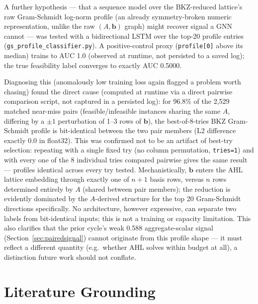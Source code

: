 \documentclass[12pt]{article}
\begin{document}
A further hypothesis --- that a sequence model over the BKZ-reduced lattice's raw Gram-Schmidt log-norm profile (an already symmetry-broken numeric representation, unlike the raw $(A,\mathbf{b})$ graph) might recover signal a GNN cannot --- was tested with a bidirectional LSTM over the top-20 profile entries (\texttt{gs\_profile\_classifier.py}). A positive-control proxy (\texttt{profile[0]} above its median) trains to AUC 1.0 (observed at runtime, not persisted to a saved log); the true feasibility label converges to exactly AUC 0.5000.

Diagnosing this (anomalously low training loss again flagged a problem worth chasing) found the direct cause (computed at runtime via a direct pairwise comparison script, not captured in a persisted log): for 96.8\% of the 2{,}529 matched near-miss pairs (feasible/infeasible instances sharing the same $A$, differing by a $\pm1$ perturbation of 1--3 rows of $\mathbf{b}$), the best-of-8-tries BKZ Gram-Schmidt profile is bit-identical between the two pair members (L2 difference exactly 0.0 in float32). This was confirmed not to be an artifact of best-try selection: repeating with a single fixed try (no column permutation, \texttt{tries=1}) and with every one of the 8 individual tries compared pairwise gives the same result --- profiles identical across every try tested. Mechanistically, $\mathbf{b}$ enters the AHL lattice embedding through exactly one of $n+1$ basis rows, versus $n$ rows determined entirely by $A$ (shared between pair members); the reduction is evidently dominated by the $A$-derived structure for the top 20 Gram-Schmidt directions specifically. No architecture, however expressive, can separate two labels from bit-identical inputs; this is not a training or capacity limitation. This also clarifies that the prior cycle's weak 0.588 aggregate-scalar signal (Section~\ref{sec:pairedsignal}) cannot originate from this profile shape --- it must reflect a different quantity (e.g.\ whether AHL solves within budget at all), a distinction future work should not conflate.

\section{Literature Grounding}
\label{sec:lit}
\end{document}
